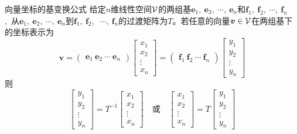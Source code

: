\documentclass[10pt, a4paper, oneside, fontset=none]{ctexart}
\theoremstyle{plain}
\theoremstyle{definition}
\newcommand{\di}[2][]{\begin{theo}{#1}\run #2\end{theo}}
\begin{document}
\di[向量坐标的基变换公式]{
    给定$n$维线性空间$\mathcal{V}$的两组基$\boldsymbol{e}_1,~\boldsymbol{e}_2,~\cdots,~\boldsymbol{e}_n$和$\boldsymbol{f}_1,~\boldsymbol{f}_2,~\cdots,~\boldsymbol{f}_n$,~从$\boldsymbol{e}_1,~\boldsymbol{e}_2,~\cdots,~\boldsymbol{e}_n$到$\boldsymbol{f}_1,~\boldsymbol{f}_2,~$ $\cdots,~\boldsymbol{f}_n$的过渡矩阵为$T$。若任意的向量$\boldsymbol{v}\in \mathcal{V}$在两组基下的坐标表示为
    $$\boldsymbol{v}=\begin{pmatrix}
        \boldsymbol{e}_1~\boldsymbol{e}_2~\cdots~\boldsymbol{e}_n
    \end{pmatrix}\begin{bmatrix}
        x_1 \\ x_2 \\ \vdots \\ x_n
    \end{bmatrix}=\begin{pmatrix}
        \boldsymbol{f}_1~\boldsymbol{f}_2~\cdots~\boldsymbol{f}_n
    \end{pmatrix}\begin{bmatrix}
        y_1 \\ y_2 \\ \vdots \\ y_n
    \end{bmatrix}$$
    则 
    $$\begin{bmatrix}
        y_1 \\ y_2 \\ \vdots \\ y_n
    \end{bmatrix}=T^{-1}\begin{bmatrix}
        x_1 \\ x_2 \\ \vdots \\ x_n
    \end{bmatrix} \quad \text{或} \quad \begin{bmatrix}
        x_1 \\ x_2 \\ \vdots \\ x_n
    \end{bmatrix}=T\begin{bmatrix}
        y_1 \\ y_2 \\ \vdots \\ y_n
    \end{bmatrix}$$
}
\end{document}
